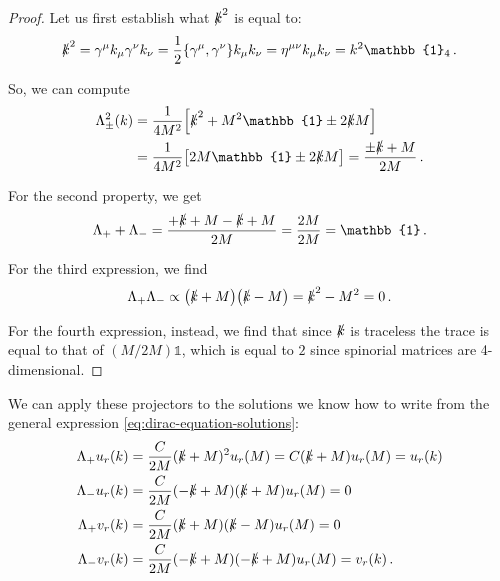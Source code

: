 \documentclass[main.tex]{subfiles}
\begin{document}
\begin{proof}
Let us first establish what \(\slashed{k}^2\) is equal to: 
%
\begin{align}
\slashed{k}^2 =
\gamma^{\mu } k_{\mu } \gamma^{\nu } k_{\nu }
= \frac{1}{2} \qty{\gamma^{\mu }, \gamma^{\nu }}k_{\mu } k_{\nu }
= \eta^{\mu \nu } k_{\mu } k_{\nu }
= k^2 \mathbb{1}_{4}
\,.
\end{align}

So, we can compute 
%
\begin{subequations}
\begin{align}
\Lambda_{\pm}^2 (k) &= \frac{1}{4 M^2}\qty[\slashed{k}^2 + M^2 \mathbb{1} \pm 2 \slashed{k} M]  \\
&= \frac{1}{4 M^2} \qty[2 M \mathbb{1} \pm 2 \slashed{k}M] = \frac{\pm \slashed{k} + M}{2M}
\,.
\end{align}
\end{subequations}

For the second property, we get 
%
\begin{align}
\Lambda_{+} + \Lambda_{-} = \frac{+ \slashed{k} + M - \slashed{k} + M}{2M} = \frac{2M}{2M} = \mathbb{1} 
\,.
\end{align}

For the third expression, we find 
%
\begin{align}
\Lambda_{+} \Lambda_{-} \propto \qty(\slashed{k} + M) \qty(\slashed{k} - M) = \slashed{k}^2 - M^2 = 0
\,.
\end{align}

For the fourth expression, instead, we find that since \(\slashed{k}\) is traceless the trace is equal to that of \((M / 2 M)  \mathbb{1}\), which is equal to \(2\) since spinorial matrices are 4-dimensional.
\end{proof}

We can apply these projectors to the solutions we know how to write from the general expression \eqref{eq:dirac-equation-solutions}: 
%
\begin{subequations}
\begin{align}
\Lambda_{+} u_r (k) &= \frac{C}{2M} (\slashed{k} + M)^2 u_r(M) = C(\slashed{k} + M) u_r (M) = u_r(k) \\
\Lambda_{-} u_r (k) &= \frac{C}{2M} (-\slashed{k} + M) (\slashed{k} + M) u_r(M) = 0 \\
\Lambda_{+} v_r (k) &= \frac{C}{2M} (\slashed{k} + M) (\slashed{k} - M) u_r(M) = 0 \\
\Lambda_{-} v_r (k) &= \frac{C}{2M} (-\slashed{k} + M) (-\slashed{k} + M) u_r(M) = v_r(k)
\,.
\end{align}
\end{subequations}
\end{document}
